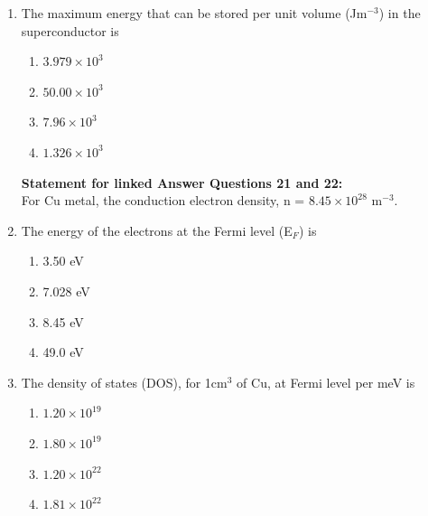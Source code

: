 \documentclass[a4paper,10pt]{article}
\begin{document}
\begin{enumerate}
\item The maximum energy that can be stored per unit volume (Jm$^{-3}$) in the superconductor is
\hfill{}

\begin{multicols}{4}
\begin{enumerate}
\item $3.979 \times 10^3$
\item $50.00 \times 10^3$
\item $7.96 \times 10^3$
\item $1.326 \times 10^3$
\end{enumerate}
\end{multicols}

\textbf{Statement for linked Answer Questions 21 and 22:} \\
For Cu metal, the conduction electron density, n = $8.45 \times 10^{28}$ m$^{-3}$.

\item The energy of the electrons at the Fermi level (E$_F$) is
\hfill{}

\begin{multicols}{4}
\begin{enumerate}
\item 3.50 eV
\item 7.028 eV
\item 8.45 eV
\item 49.0 eV
\end{enumerate}
\end{multicols}

\item The density of states (DOS), for 1cm$^3$ of Cu, at Fermi level per meV is
\hfill{}

\begin{multicols}{4}
\begin{enumerate}
\item $1.20 \times 10^{19}$
\item $1.80 \times 10^{19}$
\item $1.20 \times 10^{22}$
\item $1.81 \times 10^{22}$
\end{enumerate}
\end{multicols}
\end{enumerate}
\end{document}
